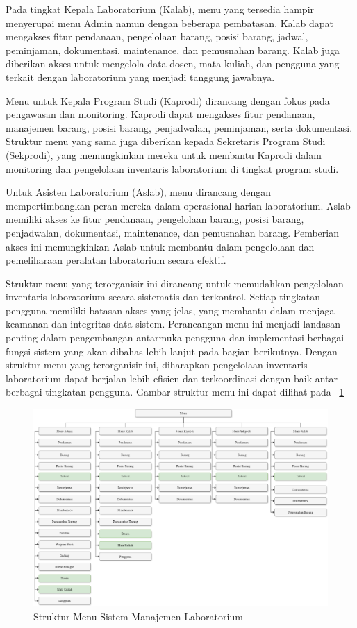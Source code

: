 Pada tingkat Kepala Laboratorium (Kalab), menu yang tersedia hampir menyerupai menu Admin namun dengan beberapa pembatasan. Kalab dapat mengakses fitur pendanaan, pengelolaan barang, posisi barang, jadwal, peminjaman, dokumentasi, maintenance, dan pemusnahan barang. Kalab juga diberikan akses untuk mengelola data dosen, mata kuliah, dan pengguna yang terkait dengan laboratorium yang menjadi tanggung jawabnya.

Menu untuk Kepala Program Studi (Kaprodi) dirancang dengan fokus pada pengawasan dan monitoring. Kaprodi dapat mengakses fitur pendanaan, manajemen barang, posisi barang, penjadwalan, peminjaman, serta dokumentasi. Struktur menu yang sama juga diberikan kepada Sekretaris Program Studi (Sekprodi), yang memungkinkan mereka untuk membantu Kaprodi dalam monitoring dan pengelolaan inventaris laboratorium di tingkat program studi.

Untuk Asisten Laboratorium (Aslab), menu dirancang dengan mempertimbangkan peran mereka dalam operasional harian laboratorium. Aslab memiliki akses ke fitur pendanaan, pengelolaan barang, posisi barang, penjadwalan, dokumentasi, maintenance, dan pemusnahan barang. Pemberian akses ini memungkinkan Aslab untuk membantu dalam pengelolaan dan pemeliharaan peralatan laboratorium secara efektif.

Struktur menu yang terorganisir ini dirancang untuk memudahkan pengelolaan inventaris laboratorium secara sistematis dan terkontrol. Setiap tingkatan pengguna memiliki batasan akses yang jelas, yang membantu dalam menjaga keamanan dan integritas data sistem. Perancangan menu ini menjadi landasan penting dalam pengembangan antarmuka pengguna dan implementasi berbagai fungsi sistem yang akan dibahas lebih lanjut pada bagian berikutnya. Dengan struktur menu yang terorganisir ini, diharapkan pengelolaan inventaris laboratorium dapat berjalan lebih efisien dan terkoordinasi dengan baik antar berbagai tingkatan pengguna.  Gambar struktur menu ini dapat dilihat pada \pic~\ref{StrukturMenuILMIS}

\begin{figure}
	\centering
	\includegraphics[width=1\textwidth]{konten/gambar/menu.png}
	\caption{Struktur Menu Sistem Manajemen Laboratorium}
	\label{StrukturMenuILMIS}
\end{figure}

